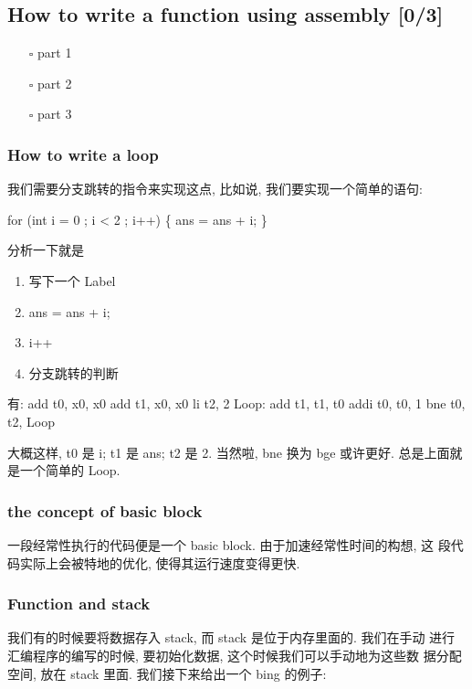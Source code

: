 \documentclass[11pt]{article}
\begin{document}
\subsection{How to write a function using assembly [0/3]}
\label{sec:org31d4fdc}
\begin{itemize}
\item[{$\square$}] part 1
\item[{$\square$}] part 2
\item[{$\square$}] part 3
\end{itemize}
\subsubsection{How to write a loop}
\label{sec:org6a40648}

我们需要分支跳转的指令来实现这点, 比如说, 我们要实现一个简单的语句: 

for (int i = 0 ; i < 2 ; i++) \{
    ans = ans + i;
\}                 

分析一下就是
\begin{enumerate}
\item 写下一个 Label
\item ans = ans + i;
\item i++
\item 分支跳转的判断
\end{enumerate}

有: 
    add t0, x0, x0
    add t1, x0, x0
    li  t2, 2
Loop:
    add t1, t1, t0
    addi t0, t0, 1
    bne t0, t2, Loop

大概这样, t0 是 i; t1 是 ans; t2 是 2. 当然啦, bne 换为 bge 或许更好.
总是上面就是一个简单的 Loop. 

\subsubsection{the concept of basic block}
\label{sec:org27d6f4b}

一段经常性执行的代码便是一个 basic block. 由于加速经常性时间的构想, 这
段代码实际上会被特地的优化, 使得其运行速度变得更快. 

\subsubsection{Function and stack}
\label{sec:org196e9c9}

我们有的时候要将数据存入 stack, 而 stack 是位于内存里面的. 我们在手动
进行汇编程序的编写的时候, 要初始化数据, 这个时候我们可以手动地为这些数
据分配空间, 放在 stack 里面. 我们接下来给出一个 bing 的例子:
\end{document}

